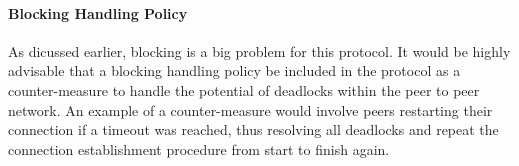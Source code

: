 \documentclass[10pt, twocolumn]{article}
\begin{document}
\paragraph{Blocking Handling Policy} 
As dicussed earlier, blocking is a big problem for this protocol. It would be highly advisable that a blocking handling policy be included in the protocol as a counter-measure to handle the potential of deadlocks within the peer to peer network. An example of a counter-measure would involve peers restarting their connection if a timeout was reached, thus resolving all deadlocks and repeat the connection establishment procedure from start to finish again. 
\end{document}
